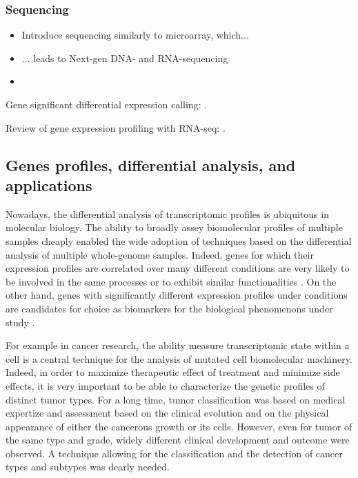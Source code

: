 	\subsubsection{Sequencing}

		\begin{itemize}
			\item Introduce sequencing similarly to microarray, which...
			\item ... leads to Next-gen DNA- and RNA-sequencing
			\item
		\end{itemize}

		Gene significant differential expression calling: \parencite{robinson2010edger}.

		Review of gene expression profiling with RNA-seq: \parencite{rapaport2013comprehensive}.

	\subsection{Genes profiles, differential analysis, and applications}

	Nowadays, the differential analysis of transcriptomic profiles is ubiquitous in molecular biology.
	The ability to broadly assey biomolecular profiles of multiple samples cheaply enabled the wide adoption of techniques based on the differential analysis of multiple whole-genome samples.
	Indeed, genes for which their expression profiles are correlated over many different conditions are very likely to be involved in the same processes or to exhibit similar functionalities \parencite{ideker2002discovering}.
	On the other hand, genes with significantly different expression profiles under conditions are candidates for choice as biomarkers for the biological phenomenons under study \parencite{altman2001whole}.

	For example in cancer research, the ability measure transcriptomic state within a cell is a central technique for the analysis of mutated cell biomolecular machinery.
	Indeed, in order to maximize therapeutic effect of treatment and minimize side effects, it is very important to be able to characterize the genetic profiles of distinct tumor types.
	For a long time, tumor classification was based on medical expertize and assessment based on the clinical evolution and on the physical appearance of either the cancerous growth or its cells.
	However, even for tumor of the same type and grade, widely different clinical development and outcome were observed.
	A technique allowing for the classification and the detection of cancer types and subtypes was dearly needed.

